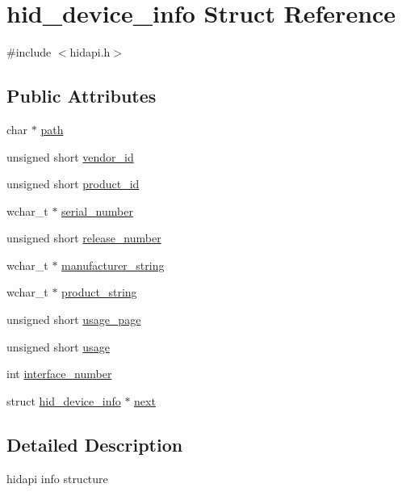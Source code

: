 \hypertarget{structhid__device__info}{\section{hid\-\_\-device\-\_\-info \-Struct \-Reference}
\label{structhid__device__info}
}


{\ttfamily \#include $<$hidapi.\-h$>$}

\subsection*{\-Public \-Attributes}
\begin{DoxyCompactItemize}
\item 
char $\ast$ \hyperlink{structhid__device__info_a6384b5bf4d9583598e5f5a889f240921}{path}
\item 
unsigned short \hyperlink{structhid__device__info_a5037a3914e0bd8a3f821d1be9376c709}{vendor\-\_\-id}
\item 
unsigned short \hyperlink{structhid__device__info_a04595915457b4374492edb1fdb62d65d}{product\-\_\-id}
\item 
wchar\-\_\-t $\ast$ \hyperlink{structhid__device__info_a80756cea367e1566f966438984b75faf}{serial\-\_\-number}
\item 
unsigned short \hyperlink{structhid__device__info_a6a832d25260f7ec17ef008e53e50e1d0}{release\-\_\-number}
\item 
wchar\-\_\-t $\ast$ \hyperlink{structhid__device__info_a484eebf746220cd2910954cc861759b7}{manufacturer\-\_\-string}
\item 
wchar\-\_\-t $\ast$ \hyperlink{structhid__device__info_aceee256b4f7cd7fdd9fa5d556f49d221}{product\-\_\-string}
\item 
unsigned short \hyperlink{structhid__device__info_ab811117f8084ce2036815bdd33b16b3b}{usage\-\_\-page}
\item 
unsigned short \hyperlink{structhid__device__info_a47f8011d58bcddd67f1403d6d3b4cab6}{usage}
\item 
int \hyperlink{structhid__device__info_a9163d8d5d7db8dc47bddfaf876e17547}{interface\-\_\-number}
\item 
struct \hyperlink{structhid__device__info}{hid\-\_\-device\-\_\-info} $\ast$ \hyperlink{structhid__device__info_a2bfebc240baf3bdaf03965816e11f149}{next}
\end{DoxyCompactItemize}


\subsection{\-Detailed \-Description}
hidapi info structure 

